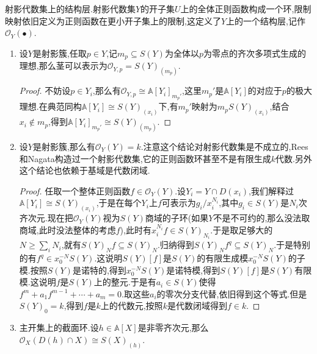 射影代数集上的结构层.射影代数集$Y$的开子集$U$上的全体正则函数构成一个环,限制映射依旧定义为正则函数在更小开子集上的限制,这定义了$Y$上的一个结构层,记作$\mathscr{O}_Y(\bullet)$.
\begin{enumerate}
	\item 设$Y$是射影簇,任取$p\in Y$,记$m_p\subseteq S(Y)$为全体以$p$为零点的齐次多项式生成的理想,那么茎可以表示为$\mathscr{O}_{Y,p}=S(Y)_{(m_p)}$.
	\begin{proof}
		
		不妨设$p\in Y_i$,那么有$\mathscr{O}_{Y,p}\cong\mathbb{A}[Y_i]_{m_p'}$,这里$m_p'$是$\mathbb{A}[Y_i]$的对应于$p$的极大理想.在典范同构$\mathbb{A}[Y_i]\cong S(Y)_{(x_i)}$下,有$m_p'$映射为$m_pS(Y)_{(x_i)}$,结合$x_i\not\in m_p$,得到$\mathbb{A}[Y_i]_{m_p'}\cong S(Y)_{(m_p)}$.
	\end{proof}
	\item 设$Y$是射影簇,那么有$\mathscr{O}_Y(Y)=k$.注意这个结论对射影代数集是不成立的,Rees和Nagata构造过一个射影代数集,它的正则函数环甚至不是有限生成$k$代数.另外这个结论也依赖于基域是代数闭域.
	\begin{proof}
		
		任取一个整体正则函数$f\in\mathscr{O}_Y(Y)$.设$Y_i=Y\cap D(x_i)$,我们解释过$\mathbb{A}[Y_i]\cong S(Y)_{(x_i)}$,于是在每个$Y_i$上$f$可表示为$g_i/x_i^{N_i}$,其中$g_i\in S(Y)$是$N_i$次齐次元.现在把$\mathscr{O}_Y(Y)$视为$S(Y)$商域的子环(如果$Y$不是不可约的,那么没法取商域,此时没法整体的考虑$f$),此时有$x_i^{N_i}f\in S(Y)_{N_i}$.于是取足够大的$N\ge\sum_iN_i$,就有$S(Y)_Nf\subseteq S(Y)_N$.归纳得到$S(Y)_Nf^q\subseteq S(Y)_N$.于是特别的有$f^q\in x_0^{-N}S(Y)$.这说明$S(Y)[f]$是$S(Y)$的有限生成模$x_0^{-N}S(Y)$的子模.按照$S(Y)$是诺特的,得到$x_0^{-N}S(Y)$是诺特模,得到$S(Y)[f]$是$S(Y)$有限模.这说明$f$是$S(Y)$上的整元.于是有$a_i\in S(Y)$使得$f^m+a_1f^{m-1}+\cdots+a_m=0$.取这些$a_i$的零次分支代替,依旧得到这个等式.但是$S(Y)_0=k$,得到$f$是$k$上的代数元,按照$k$是代数闭域得到$f\in k$.
	\end{proof}
	\item 主开集上的截面环.设$h\in\mathbb{A}[X]$是非零齐次元,那么$\mathscr{O}_X(D(h)\cap X)\cong S(X)_{(h)}$.
\end{enumerate}

